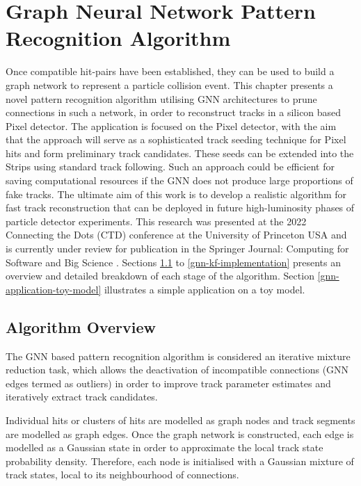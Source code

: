 
\chapter{Graph Neural Network Pattern Recognition Algorithm}\label{chapter-5}

Once compatible hit-pairs have been established, they can be used to build a graph network to represent a particle collision event. This chapter presents a novel pattern recognition algorithm utilising GNN architectures to prune connections in such a network, in order to reconstruct tracks in a silicon based Pixel detector. The application is focused on the Pixel detector, with the aim that the approach will serve as a sophisticated track seeding technique for Pixel hits and form preliminary track candidates. These seeds can be extended into the Strips using standard track following. Such an approach could be efficient for saving computational resources if the GNN does not produce large proportions of fake tracks. The ultimate aim of this work is to develop a realistic algorithm for fast track reconstruction that can be deployed in future high-luminosity phases of particle detector experiments. This research was presented at the 2022 Connecting the Dots (CTD) conference at the University of Princeton USA and is currently under review for publication in the Springer Journal: Computing for Software and Big Science \cite{Lad_2023_gnn}. Sections \ref{gnn-algorithm-overview} to \ref{gnn-kf-implementation} presents an overview and detailed breakdown of each stage of the algorithm. Section \ref{gnn-application-toy-model} illustrates a simple application on a toy model.



\section{Algorithm Overview}
\label{gnn-algorithm-overview}
The GNN based pattern recognition algorithm is considered an iterative mixture reduction task, which allows the deactivation of incompatible connections (GNN edges termed as outliers) in order to improve track parameter estimates and iteratively extract track candidates. 

Individual hits or clusters of hits are modelled as graph nodes and track segments are modelled as graph edges. Once the graph network is constructed, each edge is modelled as a Gaussian state in order to approximate the local track state probability density. Therefore, each node is initialised with a Gaussian mixture of track states, local to its neighbourhood of connections.

